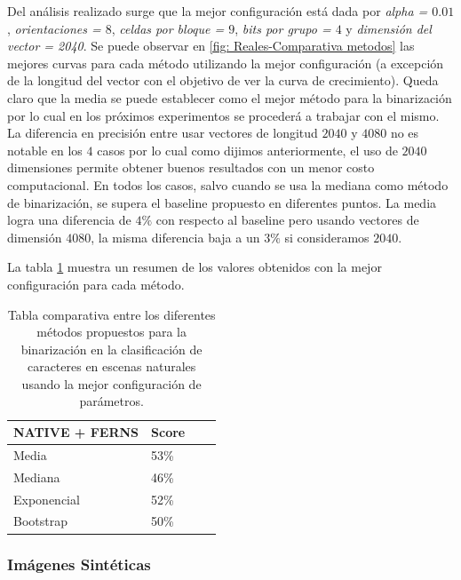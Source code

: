 	Del análisis realizado surge que la mejor configuración está dada por \textit{alpha = $0.01$}, \textit{orientaciones = $8$}, \textit{celdas por bloque = $9$}, \textit{bits por grupo = $4$} y \textit{dimensión del vector = 2040}. Se puede observar en \ref{fig: Reales-Comparativa metodos} las mejores curvas para cada método utilizando la mejor configuración (a excepción de la longitud del vector con el objetivo de ver la curva de crecimiento). Queda claro que la media se puede establecer como el mejor método para la binarización por lo cual en los próximos experimentos se procederá a trabajar con el mismo. La diferencia en precisión entre usar vectores de longitud $2040$ y $4080$ no es notable en los $4$ casos por lo cual como dijimos anteriormente, el uso de $2040$ dimensiones permite obtener buenos resultados con un menor costo computacional. En todos los casos, salvo cuando se usa la mediana como método de binarización, se supera el baseline propuesto en diferentes puntos. La media logra una diferencia de $4\%$ con respecto al baseline pero usando vectores de dimensión $4080$, la misma diferencia baja a un $3\%$ si consideramos $2040$.

	La tabla \ref{table: reales-comparativa} muestra un resumen de los valores obtenidos con la mejor configuración para cada método.

	\begin{table}
		\centering
		\begin{tabular}{ | l | l | l | p{5cm} |}
    			\hline
    				\textbf{NATIVE + FERNS} & \textbf{Score} \\ \hline
    				Media & 53\% \\ \hline
    				Mediana & 46\%\\ \hline
    				Exponencial & 52\% \\ \hline
    				Bootstrap & 50\%\\
    			\hline
    		\end{tabular}
    		\caption[Resultados imagenes naturales]{Tabla comparativa entre los diferentes métodos propuestos para la binarización en la clasificación de caracteres en escenas naturales usando la mejor configuración de parámetros.}
    		\label{table: reales-comparativa}
    	\end{table}


    	\newpage
    	\subsubsection{Imágenes Sintéticas}

